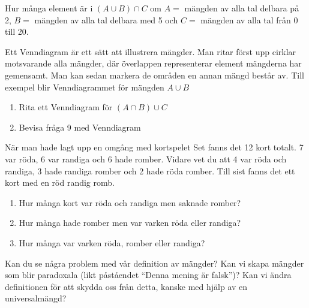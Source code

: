 \begin{problem}[Extra]
	Hur många element är i \((A \cup B) \cap C\) om \(A =\) mängden av alla tal delbara på 2, \(B = \) mängden av alla tal delbara med 5 och \(C =\) mängden av alla tal från 0 till 20.
\end{problem}

\begin{problem}[Extra]
	Ett Venndiagram är ett sätt att illustrera mängder. Man ritar först upp cirklar motsvarande alla mängder, där överlappen representerar element mängderna har gemensamt. Man kan sedan markera de områden en annan mängd består av. Till exempel blir Venndiagrammet för mängden \(A \cup B\) 
	\def\firstcircle{(0,0) circle (1.5cm)}
	\def\secondcircle{(60:2cm) circle (1.5cm)}
	\def\thirdcircle{(0:2cm) circle (1.5cm)}
	\begin{center}
	\end{center}

	\noindent
	\begin{enumerate}[label=\alph*)]
		\item Rita ett Venndiagram för \((A \cap B) \cup C \)
		\item Bevisa fråga 9 med Venndiagram
	\end{enumerate}
\end{problem}

\begin{problem}
	När man hade lagt upp en omgång med kortspelet Set fanns det 12 kort totalt. 7 var röda, 6 var randiga och 6 hade romber. Vidare vet du att 4 var röda och randiga, 3 hade randiga romber och 2 hade röda romber. Till sist fanns det ett kort med en röd randig romb.
	\begin{enumerate}[label=\alph*)]
		\item Hur många kort var röda och randiga men saknade romber?
		\item Hur många hade romber men var varken röda eller randiga?
		\item Hur många var varken röda, romber eller randiga?
	\end{enumerate}
\end{problem}

\begin{problem}
	Kan du se några problem med vår definition av mängder? Kan vi skapa mängder som blir paradoxala (likt påståendet ``Denna mening är falsk'')? Kan vi ändra definitionen för att skydda oss från detta, kanske med hjälp av en universalmängd?
\end{problem}

